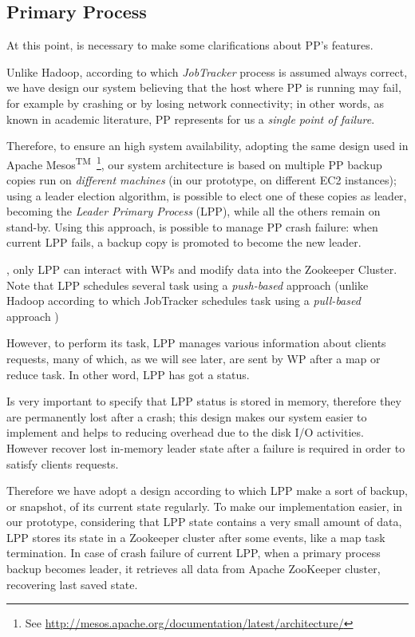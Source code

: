 \documentclass[sigchi]{acmart}
\begin{document}
\subsection{Primary Process}
At this point, is necessary to make some clarifications about PP's features.

Unlike Hadoop, according to which \textit{JobTracker} process is assumed always correct, we have design our system believing that the host where PP is running may fail, for example by crashing or by losing network connectivity; in other words, as known in academic literature, PP represents for us a \textit{single point of failure}.

Therefore, to ensure an high system availability, adopting the same design used in Apache Mesos\textsuperscript{TM}\ \footnote{See \url{http://mesos.apache.org/documentation/latest/architecture/}}, our system architecture is based on multiple PP backup copies run on \textit{different machines} (in our prototype, on different EC2 instances); using a leader election algorithm, is possible to elect one of these copies as leader, becoming the \textit{Leader Primary Process} (LPP), while all the others remain on stand-by. Using this approach, is possible to manage PP crash failure: when current LPP fails, a backup copy is promoted to become the new leader. 

, only LPP can interact with WPs and modify data into the Zookeeper Cluster. Note that LPP schedules several task using a \textit{push-based} approach (unlike Hadoop according to which JobTracker schedules task using a \textit{pull-based} approach \cite{LARTS})

However, to perform its task, LPP manages various information about clients requests, many of which, as we will see later, are sent by WP after a map or reduce task. In other word, LPP has got a status.

Is very important to specify that LPP status is stored in memory, therefore they are permanently lost after a crash; this design makes our system easier to implement and helps to reducing overhead due to the disk I/O activities. However recover lost in-memory leader state after a failure is required in order to satisfy clients requests. 

Therefore we have adopt a design according to which LPP make a sort of backup, or snapshot, of its current state regularly. To make our implementation easier, in our prototype, considering that LPP state contains a very small amount of data, LPP stores its state in a Zookeeper cluster after some events, like a map task termination. In case of crash failure of current LPP, when a primary process backup becomes leader, it retrieves all data from Apache ZooKeeper cluster, recovering last saved state.
\end{document}
